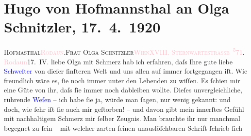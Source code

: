 

               \section[Hugo von Hofmannsthal an Olga Schnitzler, 17. 4. 1920]{ Hugo von Hofmannsthal an Olga Schnitzler, 17. 4. 1920}\nopagebreak{}\rehead{ }\normalsize\beginnumbering{} \toendnotes[C]{\smallbreak\pagebreak[2]} 
\toendnotes[C]{\smallbreak}\pstart{}{\pb}\textsc{Hofma{\geminationn}sthal}\pend{}\pstart{}\textsc{\textcolor{pink}{Rodaun}{}\ledrightnote{\textcolor{pink}{Rodaun}}.}\pend{}{\bigskip}\pstart{}\textsc{Frau Olga Schnitzler}\pend{}\pstart{}\textsc{\textcolor{pink}{Wien}{}\ledrightnote{\textcolor{pink}{Wien}}}\pend{}\pstart{}\textsc{\textcolor{pink}{XVIII. Sternwartestrasse \substVorne{}\textsuperscript{5}\substDazwischen{}7\substHinten{}1}{}\ledrightnote{\textcolor{pink}{Sternwartestraße}}.}\pend{}{\bigskip}\pstart
           \raggedleft{}{\pb}\textcolor{pink}{Rodaun}{}\ledrightnote{\textcolor{pink}{Rodaun}}{\\}17. IV.\pend
           \pstart{}liebe Olga\pend\pstart
           mit Schmerz hab ich erfahren, daſs Ihre gute liebe \textcolor{blue}{Schweſter}{} von dieſer finſteren Welt und uns allen auf immer
               fortgegangen iſt. Wie freundlich wäre es, ſie noch immer unter den Lebenden zu
               wiſſen. Es ſchien mir eine Güte von ihr, daſs ſie immer noch dableiben wollte. Dieſes
               unvergleichliche, rührende \textcolor{blue}{Weſen}{}
               – ich habe ſie ja, {\pb}würde man ſagen, nur wenig
               gekannt: und doch, wie ſehr iſt ſie auch mir geſtorben! – und davon gibt mein innerſtes
               Gefühl mit nachhaltigem Schmerz mir ſelber Zeugnis. Man brauchte ihr nur manchmal
               begegnet zu ſein – mit welcher zarten feinen unauslöſchbaren Schrift ſchrieb ſich
